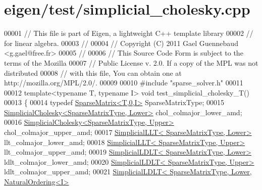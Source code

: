 \hypertarget{eigen_2test_2simplicial__cholesky_8cpp_source}{}\section{eigen/test/simplicial\+\_\+cholesky.cpp}
\label{eigen_2test_2simplicial__cholesky_8cpp_source}

\begin{DoxyCode}
00001 \textcolor{comment}{// This file is part of Eigen, a lightweight C++ template library}
00002 \textcolor{comment}{// for linear algebra.}
00003 \textcolor{comment}{//}
00004 \textcolor{comment}{// Copyright (C) 2011 Gael Guennebaud <g.gael@free.fr>}
00005 \textcolor{comment}{//}
00006 \textcolor{comment}{// This Source Code Form is subject to the terms of the Mozilla}
00007 \textcolor{comment}{// Public License v. 2.0. If a copy of the MPL was not distributed}
00008 \textcolor{comment}{// with this file, You can obtain one at http://mozilla.org/MPL/2.0/.}
00009 
00010 \textcolor{preprocessor}{#include "sparse\_solver.h"}
00011 
00012 \textcolor{keyword}{template}<\textcolor{keyword}{typename} T, \textcolor{keyword}{typename} I> \textcolor{keywordtype}{void} test\_simplicial\_cholesky\_T()
00013 \{
00014   \textcolor{keyword}{typedef} \hyperlink{group___sparse_core___module_class_eigen_1_1_sparse_matrix}{SparseMatrix<T,0,I>} SparseMatrixType;
00015   \hyperlink{group___sparse_cholesky___module_class_eigen_1_1_simplicial_cholesky}{SimplicialCholesky<SparseMatrixType, Lower>} 
      chol\_colmajor\_lower\_amd;
00016   \hyperlink{group___sparse_cholesky___module_class_eigen_1_1_simplicial_cholesky}{SimplicialCholesky<SparseMatrixType, Upper>} 
      chol\_colmajor\_upper\_amd;
00017   \hyperlink{group___sparse_cholesky___module_class_eigen_1_1_simplicial_l_l_t}{SimplicialLLT<     SparseMatrixType, Lower>} 
      llt\_colmajor\_lower\_amd;
00018   \hyperlink{group___sparse_cholesky___module_class_eigen_1_1_simplicial_l_l_t}{SimplicialLLT<     SparseMatrixType, Upper>} 
      llt\_colmajor\_upper\_amd;
00019   \hyperlink{group___sparse_cholesky___module_class_eigen_1_1_simplicial_l_d_l_t}{SimplicialLDLT<    SparseMatrixType, Lower>} 
      ldlt\_colmajor\_lower\_amd;
00020   \hyperlink{group___sparse_cholesky___module_class_eigen_1_1_simplicial_l_d_l_t}{SimplicialLDLT<    SparseMatrixType, Upper>} 
      ldlt\_colmajor\_upper\_amd;
00021   \hyperlink{group___sparse_cholesky___module_class_eigen_1_1_simplicial_l_d_l_t}{SimplicialLDLT<    SparseMatrixType, Lower, NaturalOrdering<I>}

\end{DoxyCode}
